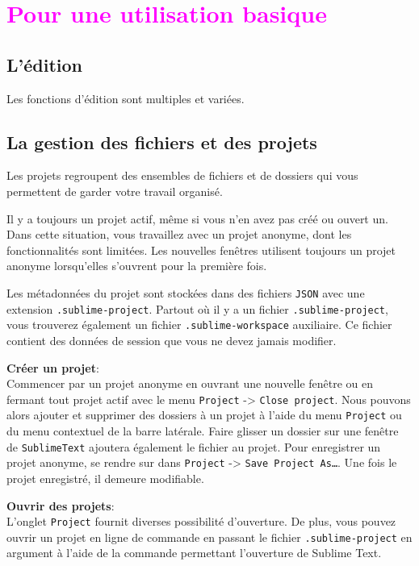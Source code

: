 \documentclass[french,a4paper]{article}
\begin{document}
\section{\textcolor{magenta}{Pour une utilisation basique}}

\subsection*{L'édition}
Les fonctions d'édition sont multiples et variées.
\bigskip

\subsection*{La gestion des fichiers et des projets}
Les projets regroupent des ensembles de fichiers et de dossiers qui vous
 permettent de garder votre travail organisé. 
\medskip

Il y a toujours un projet actif, même si vous n'en avez pas créé ou ouvert un.
 Dans cette situation, vous travaillez avec un projet anonyme, dont les
 fonctionnalités sont limitées. Les nouvelles fenêtres utilisent toujours un
 projet anonyme lorsqu'elles s'ouvrent pour la première fois.
\medskip

Les métadonnées du projet sont stockées dans des fichiers \texttt{JSON} avec 
 une extension \texttt{.sublime-project}. Partout où il y a un fichier 
 \texttt{.sublime-project}, vous trouverez également un fichier 
 \texttt{.sublime-workspace} auxiliaire. Ce fichier contient des données de 
 session que vous ne devez jamais modifier. 
\medskip

\textbf{Créer un projet}: \\
Commencer par un projet anonyme en ouvrant une nouvelle fenêtre ou en fermant
 tout projet actif avec le menu \texttt{Project} -> \texttt{Close project}.
 Nous pouvons alors ajouter et supprimer des dossiers à un projet à l'aide du 
 menu \texttt{Project} ou du menu contextuel de la barre latérale. Faire 
 glisser un dossier sur une fenêtre de \texttt{SublimeText} ajoutera également
 le fichier au projet. Pour enregistrer un projet anonyme, se rendre sur dans
 \texttt{Project} -> \texttt{Save Project As\dots}. Une fois le projet 
 enregistré, il demeure modifiable.
 \medskip

\textbf{Ouvrir des projets}: \\ 
L'onglet \texttt{Project} fournit diverses
 possibilité d'ouverture. De plus, vous pouvez ouvrir un projet en ligne de
 commande en passant le fichier \texttt{.sublime-project} en argument à l'aide
 de la commande permettant l'ouverture de Sublime Text.
\medskip
\end{document}
